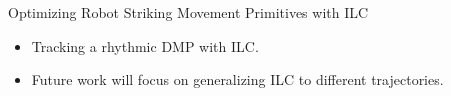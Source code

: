 \documentclass[handout]{beamer}
\begin{document}
\begin{frame}{Optimizing Robot Striking Movement Primitives with ILC}
\begin{itemize}
\item Tracking a rhythmic DMP with ILC.
\item Future work will focus on generalizing ILC to different trajectories.
\end{itemize}
\begin{figure}[ht]
\centering
{}
\label{Robot experiment} 
\end{figure}
\end{frame}
%
\end{document}
